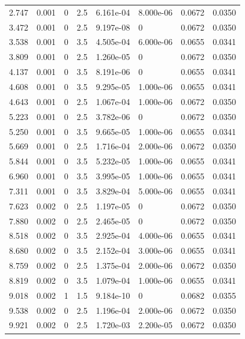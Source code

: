 \documentclass[preview]{standalone}
\begin{document}
{{\begin{tabular}{L{1.2cm}C{1.2cm} C{0.3cm}C{0.5cm} C{1.4cm}C{1.4cm} C{1.4cm}C{1.4cm}}
  2.747  &  0.001  & 0     & 2.5 &  6.161e-04  & 8.000e-06  & 0.0672 &  0.0350   \\ 
  3.472  &  0.001  & 0     & 2.5 &  9.197e-08  & 0  & 0.0672 &  0.0350   \\ 
  3.538  &  0.001  & 0     & 3.5 &  4.505e-04  & 6.000e-06  & 0.0655 &  0.0341   \\ 
  3.809  &  0.001  & 0     & 2.5 &  1.260e-05  & 0  & 0.0672 &  0.0350   \\ 
  4.137  &  0.001  & 0     & 3.5 &  8.191e-06  & 0  & 0.0655 &  0.0341   \\ 
  4.608  &  0.001  & 0     & 3.5 &  9.295e-05  & 1.000e-06  & 0.0655 &  0.0341   \\ 
  4.643  &  0.001  & 0     & 2.5 &  1.067e-04  & 1.000e-06  & 0.0672 &  0.0350   \\ 
  5.223  &  0.001  & 0     & 2.5 &  3.782e-06  & 0  & 0.0672 &  0.0350   \\ 
  5.250  &  0.001  & 0     & 3.5 &  9.665e-05  & 1.000e-06  & 0.0655 &  0.0341   \\ 
  5.669  &  0.001  & 0     & 2.5 &  1.716e-04  & 2.000e-06  & 0.0672 &  0.0350   \\ 
  5.844  &  0.001  & 0     & 3.5 &  5.232e-05  & 1.000e-06  & 0.0655 &  0.0341   \\ 
  6.960  &  0.001  & 0     & 3.5 &  3.995e-05  & 1.000e-06  & 0.0655 &  0.0341   \\ 
  7.311  &  0.001  & 0     & 3.5 &  3.829e-04  & 5.000e-06  & 0.0655 &  0.0341   \\ 
  7.623  &  0.002  & 0     & 2.5 &  1.197e-05  & 0  & 0.0672 &  0.0350   \\ 
  7.880  &  0.002  & 0     & 2.5 &  2.465e-05  & 0  & 0.0672 &  0.0350   \\ 
  8.518  &  0.002  & 0     & 3.5 &  2.925e-04  & 4.000e-06  & 0.0655 &  0.0341   \\ 
  8.680  &  0.002  & 0     & 3.5 &  2.152e-04  & 3.000e-06  & 0.0655 &  0.0341   \\ 
  8.759  &  0.002  & 0     & 2.5 &  1.375e-04  & 2.000e-06  & 0.0672 &  0.0350   \\ 
  8.819  &  0.002  & 0     & 3.5 &  1.079e-04  & 1.000e-06  & 0.0655 &  0.0341   \\ 
  9.018  &  0.002  & 1     & 1.5 &  9.184e-10  & 0  & 0.0682 &  0.0355   \\ 
  9.538  &  0.002  & 0     & 2.5 &  1.196e-04  & 2.000e-06  & 0.0672 &  0.0350   \\ 
  9.921  &  0.002  & 0     & 2.5 &  1.720e-03  & 2.200e-05  & 0.0672 &  0.0350   \\ 

\end{tabular}}}
\end{document}
